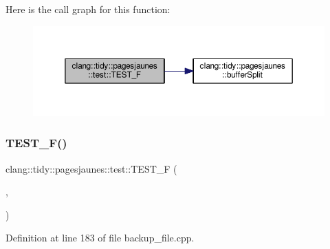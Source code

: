 Here is the call graph for this function\+:
\nopagebreak
\begin{figure}[H]
\begin{center}
\leavevmode
\includegraphics[width=350pt]{namespaceclang_1_1tidy_1_1pagesjaunes_1_1test_af3a20a024177569efd2b45f21e207966_cgraph}
\end{center}
\end{figure}
\mbox{\label{namespaceclang_1_1tidy_1_1pagesjaunes_1_1test_a99b625197cc47c5c30f4509a335dd64c}} 
\subsubsection{\texorpdfstring{T\+E\+S\+T\+\_\+\+F()}{TEST\_F()}\hspace{0.1cm}{\footnotesize\ttfamily [42/57]}}
{\footnotesize\ttfamily clang\+::tidy\+::pagesjaunes\+::test\+::\+T\+E\+S\+T\+\_\+F (\begin{DoxyParamCaption}\item[{\hyperlink{classclang_1_1tidy_1_1pagesjaunes_1_1test_1_1_backup_file}{Backup\+File}}]{,  }\item[{Many\+Backup\+Log2}]{ }\end{DoxyParamCaption})}



Definition at line 183 of file backup\+\_\+file.\+cpp.


